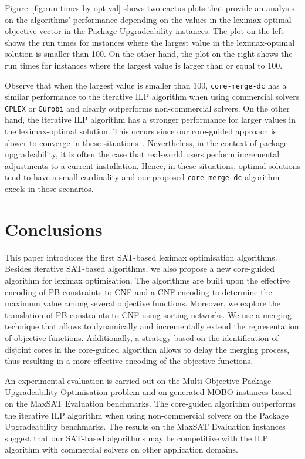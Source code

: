 \documentclass[a4paper,UKenglish,cleveref, autoref, thm-restate]{lipics-v2021}
\begin{document}
Figure~\ref{fig:run-times-by-opt-val} shows two cactus plots that provide an analysis on the algorithms' performance depending on the values in the leximax-optimal objective vector in the Package Upgradeability instances.
The plot on the left shows the run times for instances where the largest value in the leximax-optimal solution is smaller than 100.
On the other hand, the plot on the right shows the run times for instances where the largest value is larger than or equal to 100.

Observe that when the largest value is smaller than $100$, \texttt{core-merge-dc} has a similar performance to the iterative ILP algorithm when using commercial solvers \texttt{CPLEX} or \texttt{Gurobi} and clearly outperforms non-commercial solvers.
On the other hand, the iterative ILP algorithm has a stronger performance for larger values in the leximax-optimal solution.
This occurs since our core-guided approach is slower to converge in these situations~\cite{detailed-tables}.
Nevertheless, in the context of package upgradeability, it is often the case that real-world users perform incremental adjustments to a current installation. Hence, in these situations, optimal solutions tend to have a small cardinality and our proposed \texttt{core-merge-dc} algorithm excels in those scenarios. 
\section{Conclusions}
\label{sec:concl}

This paper introduces the first SAT-based leximax optimisation algorithms.
Besides iterative SAT-based algorithms, we also propose a new core-guided algorithm for leximax optimisation. The algorithms are built upon the effective encoding of PB constraints to CNF and a CNF encoding to determine the maximum value among several objective functions.
Moreover, we explore the translation of PB constraints to CNF using sorting networks. We use a merging technique that allows to dynamically and incrementally extend the representation of objective functions. Additionally, a strategy based on the identification of disjoint cores in the core-guided algorithm allows to delay the merging process, thus resulting in a more effective encoding of the objective functions.

An experimental evaluation is carried out on the Multi-Objective Package Upgradeability Optimisation problem and on generated MOBO instances based on the MaxSAT Evaluation benchmarks.
The core-guided algorithm outperforms the iterative ILP algorithm when using non-commercial solvers on the Package Upgradeability benchmarks.
The results on the MaxSAT Evaluation instances suggest that our SAT-based algorithms may be competitive with the ILP algorithm with commercial solvers on other application domains.
\end{document}
